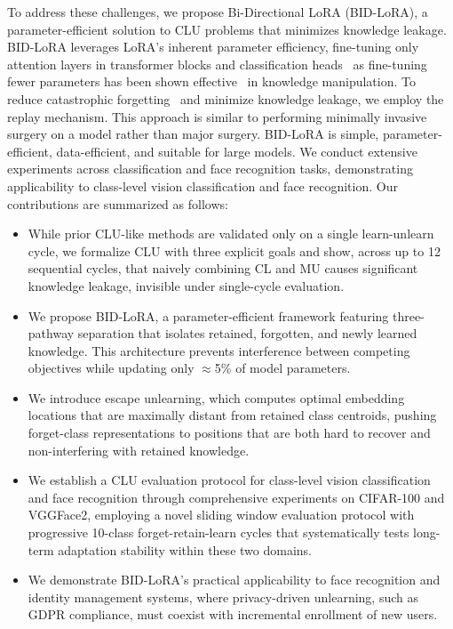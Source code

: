 To address these challenges, we propose Bi-Directional LoRA (BID-LoRA), a parameter-efficient solution to CLU problems that minimizes knowledge leakage. BID-LoRA leverages LoRA's inherent parameter efficiency, fine-tuning only attention layers in transformer blocks and classification heads~\cite{houlsby2019parameter,hu2022lora,li2021prefix,geva2020transformer} as fine-tuning fewer parameters has been shown effective~\cite{mallya2018packnet,mallya2018piggyback,wang2022learning,zhang2022continual} in knowledge manipulation. To reduce catastrophic forgetting~\cite{kirkpatrick2017overcoming} and minimize knowledge leakage, we employ the replay mechanism. This approach is similar to performing minimally invasive surgery on a model rather than major surgery. BID-LoRA is simple, parameter-efficient, data-efficient, and suitable for large models. We conduct extensive experiments across classification and face recognition tasks, demonstrating applicability to class-level vision classification and face recognition. Our contributions are summarized as follows:
\label{contributions}
\begin{itemize}
    \item While prior CLU-like methods are validated only on a single learn-unlearn cycle, we formalize CLU with three explicit goals and show, across up to 12 sequential cycles, that naively combining CL and MU causes significant knowledge leakage, invisible under single-cycle evaluation.
    
    \item We propose BID-LoRA, a parameter-efficient framework featuring three-pathway separation that isolates retained, forgotten, and newly learned knowledge. This architecture prevents interference between competing objectives while updating only $\approx$5\% of model parameters.
    
    \item We introduce escape unlearning, which computes optimal embedding locations that are maximally distant from retained class centroids, pushing forget-class representations to positions that are both hard to recover and non-interfering with retained knowledge.
    
    \item We establish a CLU evaluation protocol for class-level vision classification and face recognition through comprehensive experiments on CIFAR-100 and VGGFace2, employing a novel sliding window evaluation protocol with progressive 10-class forget-retain-learn cycles that systematically tests long-term adaptation stability within these two domains.
    
    \item We demonstrate BID-LoRA's practical applicability to face recognition and identity management systems, where privacy-driven unlearning, such as GDPR compliance, must coexist with incremental enrollment of new users.
\end{itemize}